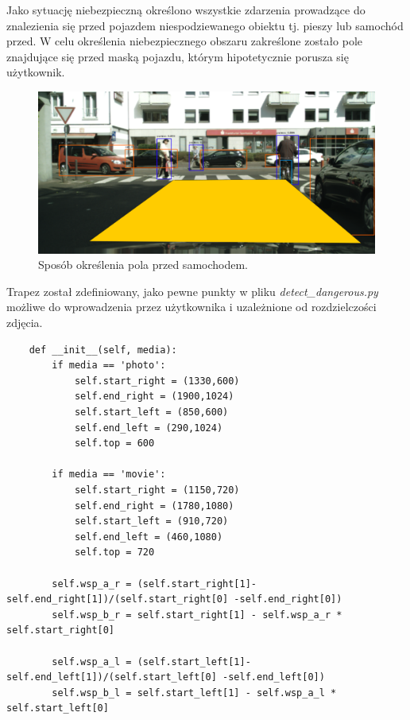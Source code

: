 \hspace{0.5cm}
Jako sytuację niebezpieczną określono wszystkie zdarzenia prowadzące do znalezienia się przed pojazdem niespodziewanego obiektu tj. pieszy lub samochód przed. W celu określenia niebezpiecznego obszaru zakreślone zostało pole znajdujące się przed maską pojazdu, którym hipotetycznie porusza się użytkownik.

\begin{figure}[H]
    \centering
    \includegraphics[width=0.7\linewidth]{Obrazy/Rozdzial05/trapez.png}
    \caption{Sposób określenia pola przed samochodem.}
    \label{fig:trapez}
\end{figure}

\hspace{0.5cm}
Trapez został zdefiniowany, jako pewne punkty w pliku \emph{detect\_dangerous.py} możliwe do wprowadzenia przez użytkownika i uzależnione od rozdzielczości zdjęcia.

\begin{code}
    \label{code:c-code}
    \begin{verbatim}
    def __init__(self, media):
        if media == 'photo':
            self.start_right = (1330,600)
            self.end_right = (1900,1024)
            self.start_left = (850,600)
            self.end_left = (290,1024)
            self.top = 600
        
        if media == 'movie':
            self.start_right = (1150,720)
            self.end_right = (1780,1080)
            self.start_left = (910,720)
            self.end_left = (460,1080)
            self.top = 720

        self.wsp_a_r = (self.start_right[1]-self.end_right[1])/(self.start_right[0] -self.end_right[0])
        self.wsp_b_r = self.start_right[1] - self.wsp_a_r * self.start_right[0]

        self.wsp_a_l = (self.start_left[1]-self.end_left[1])/(self.start_left[0] -self.end_left[0])
        self.wsp_b_l = self.start_left[1] - self.wsp_a_l * self.start_left[0]
    \end{verbatim}
    \end{code}

